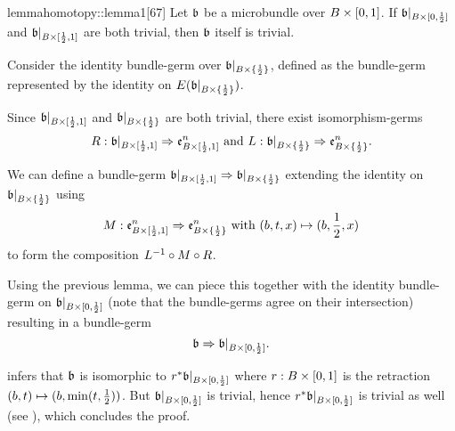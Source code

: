 \begin{scope}
    \newcommand{\bbleft} {
        \bb[B {\cross} [0, \half]]
    }
    \newcommand{\bbright} {
        \bb[B {\cross} [\half, 1]]
    }
    \newcommand{\bbhalf} {
        \bb[B {\cross} \coll{\half{}}]
    }


    \begin{mystatement}{lemma}{homotopy::lemma1}[67]
        Let $\bb$ be a microbundle over $B \times{} [0, 1]$.
        If $\bbleft$ and $\bbright$ are both trivial,
        then $\bb$ itself is trivial.
    \end{mystatement}

    \begin{myproof}
        Consider the identity bundle-germ over $\bbhalf$,
        defined as the bundle-germ represented by the identity on $E(\bbhalf)$.
        
        Since $\bbright$ and $\bbhalf$ are both trivial,
        there exist isomorphism-germs
        \[
            \germdef{R}{\bbright}{\be{B {\cross} [\half, 1]}} \tand
            \germdef{L}{\bbhalf}{\be{B {\cross} \coll{\half}}}.
        \]

        We can define a bundle-germ $\germ{\bbright}{\bbhalf}$
        extending the identity on $\bbhalf$ using
        \[
            M: \mathfrak{e}^{n}_{B \times [\frac{1}{2}, 1]} \Rightarrow{} \mathfrak{e}^{n}_{B \times \{\frac{1}{2}\}} \text{ with }
            (b, t, x) \mapsto (b, \frac{1}{2}, x)
        \]
        to form the composition $L^{-1} \circ M \circ R$.

        Using the previous lemma, we can piece this together with the
        identity bundle-germ on $\bbleft$
        (note that the bundle-germs agree on their intersection)
        resulting in a bundle-germ
        \[ \germ{\bb}{\bbleft}. \]

         infers that $\bb$
        is isomorphic to $\ind{r}\bbleft$
        where $r: B \times [0, 1]$ is the
        retraction $(b, t) \mapsto (b, \min(t, \frac{1}{2}))$.
        But $\bbleft$ is trivial, hence $\ind{r}\bbleft$ is
        trivial as well (see ),
        which concludes the proof.
    \end{myproof}
\end{scope}